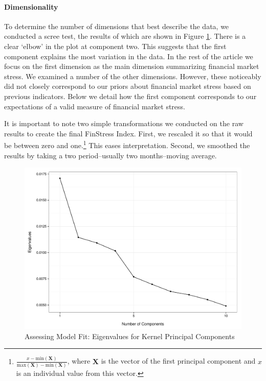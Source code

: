 \documentclass[]{article}
\begin{document}
\paragraph{Dimensionality}\label{dimensionality}

To determine the number of dimensions that best describe the data, we conducted a scree test, the results of which are shown in Figure \ref{scree_plot}. There is a clear `elbow' in the plot at component two. This suggests that the first component explains the most variation in the data. In the rest of the article we focus on the first dimension as the main dimension summarizing financial market stress. We examined a number of the other dimensions. However, these noticeably did not closely correspond to our priors about financial market stress based on previous indicators. Below we detail how the first component corresponds to our expectations of a valid measure of financial market stress.

It is important to note two simple transformations we conducted on the raw results to create the final FinStress Index. First, we rescaled it so that it would be between zero and one.\footnote{\(\frac{x - \mathrm{min}(\bm{X})}{\mathrm{max}(\bm{X}) - \mathrm{min}(\bm{X})}\),
  where \(\bm{X}\) is the vector of the first principal component and
  \(x\) is an individual value from this vector.} This eases
interpretation. Second, we smoothed the results by taking a two period--usually two months--moving average.

\begin{figure}
    \caption{Assessing Model Fit: Eigenvalues for Kernel Principal Components}
    \label{scree_plot}
    \begin{center}
        \includegraphics[scale=0.5]{figures/scree_plot.pdf}
    \end{center}
\end{figure}
\end{document}
